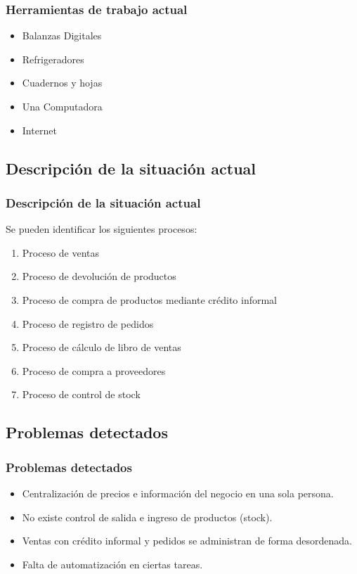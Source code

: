 \documentclass{beamer}
\begin{document}
\begin{frame}
\frametitle{Herramientas de trabajo actual}
\begin{itemize}
\item Balanzas Digitales
\item Refrigeradores
\item Cuadernos y hojas
\item \alert{Una Computadora}
\item \alert{Internet}
\end{itemize}
\end{frame}

\subsection{Descripción de la situación actual}

\begin{frame}
\frametitle{Descripción de la situación actual}
Se pueden identificar los siguientes procesos:
\begin{enumerate}
\item Proceso de ventas
\item Proceso de devolución de productos
\item Proceso de compra de productos mediante crédito informal
\item Proceso de registro de pedidos
\item Proceso de cálculo de libro de ventas
\item Proceso de compra a proveedores
\item Proceso de control de stock
\end{enumerate}
\end{frame}

\subsection{Problemas detectados}

\begin{frame}
\frametitle{Problemas detectados}
\begin{itemize}
\item Centralización de precios e información del negocio en una sola persona.
\item No existe control de salida e ingreso de productos (stock).
\item Ventas con crédito informal y pedidos se administran de forma desordenada.
\item Falta de automatización en ciertas tareas.
\end{itemize}
\end{frame}
\end{document}
